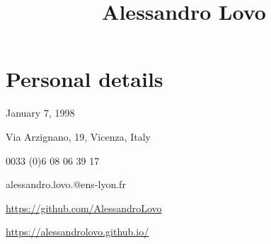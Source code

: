 \documentclass[11pt, a4 paper]{article}
\begin{document}
\title{Alessandro Lovo}
\date{}
\author{}
\maketitle


\section*{Personal details}
  \begin{multicols}{2}
    \begin{description}[style=multiline,leftmargin=2cm,align=right]
      \item[birth] January 7, 1998
      \item[address] Via Arzignano, 19, Vicenza, Italy
      \item[phone] 0033 (0)6 08 06 39 17
      \item[e-mail]
        alessandro.lovo.@ens-lyon.fr

      \item[GitHub] {\small \url{https://github.com/AlessandroLovo}}
      \item[Website] {\small \url{https://alessandrolovo.github.io/}}
    \end{description}
  \end{multicols}
\end{document}

